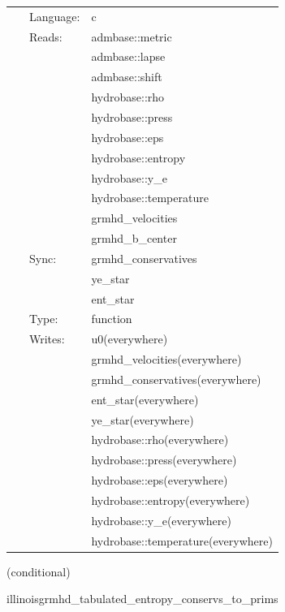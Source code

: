  \begin{tabular*}{160mm}{cll} 
~ & Language:  & c \\ 
~ & Reads:  & admbase::metric \\ 
~& ~ &admbase::lapse\\ 
~& ~ &admbase::shift\\ 
~& ~ &hydrobase::rho\\ 
~& ~ &hydrobase::press\\ 
~& ~ &hydrobase::eps\\ 
~& ~ &hydrobase::entropy\\ 
~& ~ &hydrobase::y\_e\\ 
~& ~ &hydrobase::temperature\\ 
~& ~ &grmhd\_velocities\\ 
~& ~ &grmhd\_b\_center\\ 
~ & Sync:  & grmhd\_conservatives \\ 
~& ~ &ye\_star\\ 
~& ~ &ent\_star\\ 
~ & Type:  & function \\ 
~ & Writes:  & u0(everywhere) \\ 
~& ~ &grmhd\_velocities(everywhere)\\ 
~& ~ &grmhd\_conservatives(everywhere)\\ 
~& ~ &ent\_star(everywhere)\\ 
~& ~ &ye\_star(everywhere)\\ 
~& ~ &hydrobase::rho(everywhere)\\ 
~& ~ &hydrobase::press(everywhere)\\ 
~& ~ &hydrobase::eps(everywhere)\\ 
~& ~ &hydrobase::entropy(everywhere)\\ 
~& ~ &hydrobase::y\_e(everywhere)\\ 
~& ~ &hydrobase::temperature(everywhere)\\ 
\end{tabular*} 


\vspace{5mm}

   (conditional) 

\hspace{5mm} illinoisgrmhd\_tabulated\_entropy\_conservs\_to\_prims 

\hspace{5mm}{\it entropy+tabulated version of illinoisgrmhd\_conservs\_to\_prims } 


\hspace{5mm}

